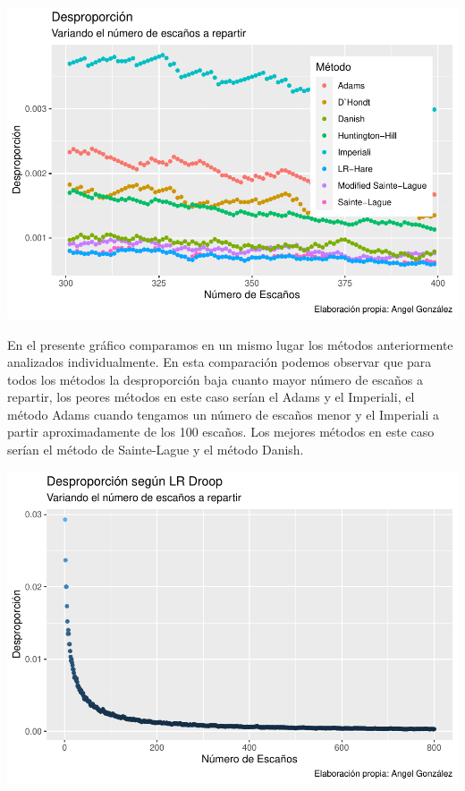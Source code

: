 \documentclass[12pt,a4paper,]{book}
\numberwithin{dummy}{section}
\theoremstyle{ocrenumbox}
\theoremstyle{blacknumex}
\theoremstyle{blacknumbox}
\theoremstyle{ocrenum}
\theoremstyle{ocrenum}
\begin{document}
\begin{center}\includegraphics[width=0.95\linewidth]{figurasR/unnamed-chunk-45-1} \end{center}

En el presente gráfico comparamos en un mismo lugar los métodos
anteriormente analizados individualmente. En esta comparación podemos
observar que para todos los métodos la desproporción baja cuanto mayor
número de escaños a repartir, los peores métodos en este caso serían el
Adams y el Imperiali, el método Adams cuando tengamos un número de
escaños menor y el Imperiali a partir aproximadamente de los 100
escaños. Los mejores métodos en este caso serían el método de
Sainte-Lague y el método Danish.

\begin{center}\includegraphics[width=0.95\linewidth]{figurasR/unnamed-chunk-46-1} \end{center}
\end{document}
